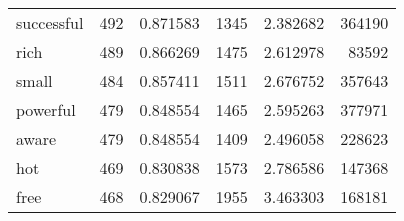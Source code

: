\begin{table}[ht]
\begin{tabular}{lrrrrr}
successful & {\cellcolor[HTML]{EFF9FB}} \color[HTML]{000000} 492 & {\cellcolor[HTML]{EFF9FB}} \color[HTML]{000000} 0.871583 & {\cellcolor[HTML]{F7FCFD}} \color[HTML]{000000} 1345 & {\cellcolor[HTML]{F7FCFD}} \color[HTML]{000000} 2.382682 & {\cellcolor[HTML]{E1F4F6}} \color[HTML]{000000} 364190 \\
rich & {\cellcolor[HTML]{F0F9FB}} \color[HTML]{000000} 489 & {\cellcolor[HTML]{F0F9FB}} \color[HTML]{000000} 0.866269 & {\cellcolor[HTML]{EEF8FB}} \color[HTML]{000000} 1475 & {\cellcolor[HTML]{EFF9FB}} \color[HTML]{000000} 2.612978 & {\cellcolor[HTML]{F7FCFD}} \color[HTML]{000000} 83592 \\
small & {\cellcolor[HTML]{F1FAFC}} \color[HTML]{000000} 484 & {\cellcolor[HTML]{F1FAFC}} \color[HTML]{000000} 0.857411 & {\cellcolor[HTML]{ECF8FA}} \color[HTML]{000000} 1511 & {\cellcolor[HTML]{ECF8FA}} \color[HTML]{000000} 2.676752 & {\cellcolor[HTML]{E2F4F7}} \color[HTML]{000000} 357643 \\
powerful & {\cellcolor[HTML]{F3FAFC}} \color[HTML]{000000} 479 & {\cellcolor[HTML]{F3FAFC}} \color[HTML]{000000} 0.848554 & {\cellcolor[HTML]{EFF9FB}} \color[HTML]{000000} 1465 & {\cellcolor[HTML]{EFF9FB}} \color[HTML]{000000} 2.595263 & {\cellcolor[HTML]{DFF3F5}} \color[HTML]{000000} 377971 \\
aware & {\cellcolor[HTML]{F3FAFC}} \color[HTML]{000000} 479 & {\cellcolor[HTML]{F3FAFC}} \color[HTML]{000000} 0.848554 & {\cellcolor[HTML]{F3FAFC}} \color[HTML]{000000} 1409 & {\cellcolor[HTML]{F3FAFC}} \color[HTML]{000000} 2.496058 & {\cellcolor[HTML]{ECF8FB}} \color[HTML]{000000} 228623 \\
hot & {\cellcolor[HTML]{F7FCFD}} \color[HTML]{000000} 469 & {\cellcolor[HTML]{F7FCFD}} \color[HTML]{000000} 0.830838 & {\cellcolor[HTML]{E7F6F9}} \color[HTML]{000000} 1573 & {\cellcolor[HTML]{E7F6F9}} \color[HTML]{000000} 2.786586 & {\cellcolor[HTML]{F2FAFC}} \color[HTML]{000000} 147368 \\
free & {\cellcolor[HTML]{F7FCFD}} \color[HTML]{000000} 468 & {\cellcolor[HTML]{F7FCFD}} \color[HTML]{000000} 0.829067 & {\cellcolor[HTML]{BAE5DC}} \color[HTML]{000000} 1955 & {\cellcolor[HTML]{BAE5DC}} \color[HTML]{000000} 3.463303 & {\cellcolor[HTML]{F1FAFC}} \color[HTML]{000000} 168181 \\
\bottomrule
\end{tabular}
\end{table}
